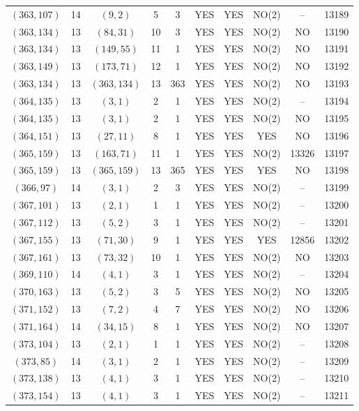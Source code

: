 \begin{longtable}{|c|c|c|c|c|c|c|c|c|c|}
$(363, 107)$ & 14 & $(9, 2)$ & 5 & 3 & YES & YES & NO(2) & -- & 13189\\
$(363, 134)$ & 13 & $(84, 31)$ & 10 & 3 & YES & YES & NO(2) & NO & 13190\\
$(363, 134)$ & 13 & $(149, 55)$ & 11 & 1 & YES & YES & NO(2) & NO & 13191\\
$(363, 149)$ & 13 & $(173, 71)$ & 12 & 1 & YES & YES & NO(2) & NO & 13192\\
$(363, 134)$ & 13 & $(363, 134)$ & 13 & 363 & YES & YES & NO(2) & NO & 13193\\
$(364, 135)$ & 13 & $(3, 1)$ & 2 & 1 & YES & YES & NO(2) & -- & 13194\\
$(364, 135)$ & 13 & $(3, 1)$ & 2 & 1 & YES & YES & NO(2) & NO & 13195\\
$(364, 151)$ & 13 & $(27, 11)$ & 8 & 1 & YES & YES & YES & NO & 13196\\
$(365, 159)$ & 13 & $(163, 71)$ & 11 & 1 & YES & YES & NO(2) & 13326 & 13197\\
$(365, 159)$ & 13 & $(365, 159)$ & 13 & 365 & YES & YES & YES & NO & 13198\\
$(366, 97)$ & 14 & $(3, 1)$ & 2 & 3 & YES & YES & NO(2) & -- & 13199\\
$(367, 101)$ & 13 & $(2, 1)$ & 1 & 1 & YES & YES & NO(2) & -- & 13200\\
$(367, 112)$ & 13 & $(5, 2)$ & 3 & 1 & YES & YES & NO(2) & -- & 13201\\
$(367, 155)$ & 13 & $(71, 30)$ & 9 & 1 & YES & YES & YES & 12856 & 13202\\
$(367, 161)$ & 13 & $(73, 32)$ & 10 & 1 & YES & YES & NO(2) & NO & 13203\\
$(369, 110)$ & 14 & $(4, 1)$ & 3 & 1 & YES & YES & NO(2) & -- & 13204\\
$(370, 163)$ & 13 & $(5, 2)$ & 3 & 5 & YES & YES & NO(2) & NO & 13205\\
$(371, 152)$ & 13 & $(7, 2)$ & 4 & 7 & YES & YES & NO(2) & NO & 13206\\
$(371, 164)$ & 14 & $(34, 15)$ & 8 & 1 & YES & YES & NO(2) & NO & 13207\\
$(373, 104)$ & 13 & $(2, 1)$ & 1 & 1 & YES & YES & NO(2) & -- & 13208\\
$(373, 85)$ & 14 & $(3, 1)$ & 2 & 1 & YES & YES & NO(2) & -- & 13209\\
$(373, 138)$ & 13 & $(4, 1)$ & 3 & 1 & YES & YES & NO(2) & -- & 13210\\
$(373, 154)$ & 13 & $(4, 1)$ & 3 & 1 & YES & YES & NO(2) & -- & 13211\\

\end{longtable}
